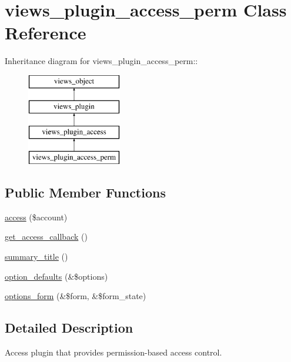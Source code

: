 \hypertarget{classviews__plugin__access__perm}{
\section{views\_\-plugin\_\-access\_\-perm Class Reference}
\label{classviews__plugin__access__perm}
}
Inheritance diagram for views\_\-plugin\_\-access\_\-perm::\begin{figure}[H]
\begin{center}
\leavevmode
\includegraphics[height=4cm]{classviews__plugin__access__perm}
\end{center}
\end{figure}
\subsection*{Public Member Functions}
\begin{CompactItemize}
\item 
\hyperlink{classviews__plugin__access__perm_c5b655153815ade74513b1af48c18cad}{access} (\$account)
\item 
\hyperlink{classviews__plugin__access__perm_c9dce994826265f48711a23cf3f2414f}{get\_\-access\_\-callback} ()
\item 
\hyperlink{classviews__plugin__access__perm_1e0e33b03ffddf2b98c60740222d8ca5}{summary\_\-title} ()
\item 
\hyperlink{classviews__plugin__access__perm_5c87d379496d4e48b22f0cfe8353a2e1}{option\_\-defaults} (\&\$options)
\item 
\hyperlink{classviews__plugin__access__perm_f662e29c6b61b1a476b7b9ba368f5650}{options\_\-form} (\&\$form, \&\$form\_\-state)
\end{CompactItemize}


\subsection{Detailed Description}
Access plugin that provides permission-based access control. 

